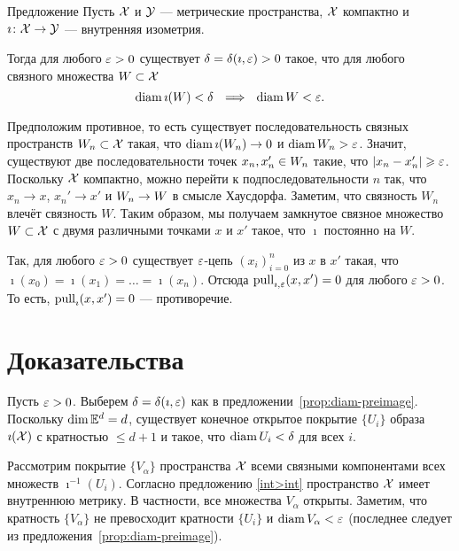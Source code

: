 \documentclass[oneside,a4paper]{article}
\begin{document}
\begin{thm}{Предложение}\label{prop:diam-preimage} 
Пусть $\mathcal{X}$ и $\mathcal{Y}$ --- метрические пространства, 
$\mathcal{X}$ компактно и $\imath\colon\mathcal{X}\to \mathcal{Y}$ --- внутренняя изометрия.

Тогда для любого $\varepsilon>0$ существует $\delta=\delta(\imath,\varepsilon)>0$ такое, что для любого связного множества $W\subset \mathcal{X}$  
$$\diam \imath(W)<\delta\ \ \Longrightarrow\ \ \diam W<\eps.$$ 

\end{thm}

Предположим противное, то есть существует последовательность связных пространств $W_n\subset \mathcal{X}$ такая, что $\mathop{\rm diam}\nolimits \imath(W_n)\to 0$ и $\mathop{\rm diam}\nolimits W_n>\varepsilon$.
Значит, существуют две последовательности точек $x_n,x_n'\z\in W_n$ такие, что $|x_n -x_n'|\geqslant\varepsilon$. 
Поскольку $\mathcal{X}$ компактно,
можно перейти к подпоследовательности $n$ так, что $x_n\to x$, $x_n'\to x'$ и $W_n\z\to W$ в смысле Хаусдорфа.
Заметим, что связность $W_n$ влечёт связность $W$.
Таким образом, мы получаем замкнутое связное множество $W\subset \mathcal{X}$ с двумя различными точками $x$ и $x'$ такое, что $\imath$ постоянно на $W$. 

Так, для любого $\varepsilon>0$ существует $\varepsilon$-цепь $(x_i)_{i=0}^n$ из $x$ в $x'$ такая, что $\imath(x_0)=\imath(x_1)=\dots=\imath(x_n)$.
Отсюда $\mathop{\rm pull}\nolimits_{\imath,\varepsilon}(x,x')=0$ для любого $\varepsilon>0$.
То есть, $\mathop{\rm pull}\nolimits_{\imath}(x,x')=0$ --- противоречие.
\qeds










\section{Доказательства}
\label{proofs}

Пусть $\varepsilon>0$.
Выберем $\delta\z=\delta(\imath,\eps)$ как в предложении~\ref{prop:diam-preimage}. 
Поскольку $\mathop{\rm dim}\nolimits \mathbb{E}^d=d$, существует конечное открытое покрытие $\{U_i\}$ образа $\imath(\mathcal{X})$ с кратностью $\le d+1$ и
такое, что $\mathop{\rm diam}\nolimits U_i<\delta$ для всех $i$.

Рассмотрим покрытие $\{V_\alpha\}$ пространства $\mathcal{X}$ всеми связными компонентами всех множеств $\imath^{-1}(U_i)$.
Согласно предложению \ref{int>int} пространство $\mathcal{X}$ имеет внутреннюю метрику.
В частности,
все множества $V_\alpha$ открыты.
Заметим, что кратность $\{V_\alpha\}$ не превосходит кратности $\{U_i\}$ 
и $\mathop{\rm diam}\nolimits V_\alpha<\varepsilon$ (последнее следует из предложения~\ref{prop:diam-preimage}).
\qeds
\end{document}
